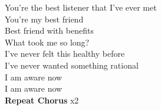 You're the best listener that I've ever met\\
You're my best friend\\
Best friend with benefits\\
What took me so long?\\
I've never felt this healthy before\\
I've never wanted something rational\\
I am aware now\\
I am aware now\\
\textbf{Repeat Chorus} x2
